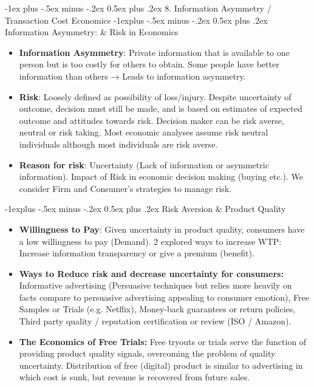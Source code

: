 \documentclass[12pt, landscape]{article}
\makeatletter
\renewcommand{\section}{\@startsection{section}{1}{0mm}%
                                {-1ex plus -.5ex minus -.2ex}%
                                {0.5ex plus .2ex}%
                                {\normalfont\large\bfseries}}
\renewcommand{\subsection}{\@startsection{subsection}{2}{0mm}%
                                {-1explus -.5ex minus -.2ex}%
                                {0.5ex plus .2ex}%
                                {\normalfont\normalsize\bfseries}}
\makeatother
\begin{document}
\begin{multicols*}{3}
\section{8. Information Asymmetry / Transaction Cost Economics}
\subsection{Information Asymmetry: \& Risk in Economics}
\begin{itemize}
\item \textbf{Information Asymmetry}: Private information that is available to one person but is too costly for others to obtain. Some people have better information than others → Leads to information asymmetry.
\item \textbf{Risk}: Loosely defined as possibility of loss/injury. Despite uncertainty of outcome, decision must still be made, and is based on estimates of expected outcome and attitudes towards risk. Decision maker can be risk averse, neutral or risk taking. Most economic analyses assume risk neutral individuals although most individuals are risk averse.
\item \textbf{Reason for risk}: Uncertainty (Lack of information or asymmetric information). Impact of Risk in economic decision making (buying etc.). We consider Firm and Consumer’s strategies to manage risk.
\end{itemize}
\subsection{Risk Aversion \& Product Quality}
\begin{itemize}
\item \textbf{Willingness to Pay}: Given uncertainty in product quality, consumers have a low willingness to pay (Demand). 2 explored ways to increase WTP: Increase information transparency or give a premium (benefit).
\item \textbf{Ways to Reduce risk and decrease uncertainty for consumers:} Informative advertising (Persuasive techniques but relies more heavily on facts compare to persuasive advertising appealing to consumer emotion), Free Samples or Trials (e.g. Netflix), Money-back guarantees or return policies, Third party quality / reputation certification or review (ISO / Amazon).
\item \textbf{The Economics of Free Trials:} Free tryouts or trials serve the function of providing product quality signals, overcoming the problem of quality uncertainty. Distribution of free (digital) product is similar to advertising in which cost is sunk, but revenue is recovered from future sales.
\end{itemize}

\end{multicols*}
\end{document}
